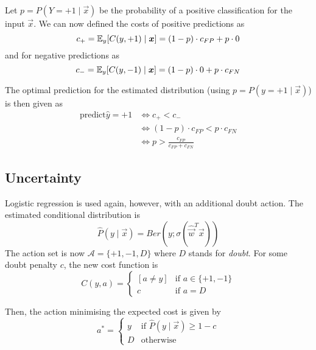 Let $p = P(Y = +1 \mid \vec{x})$ be the
probability of a positive classification
for the input $\vec{x}$.
We can now defined the costs of positive
predictions as
\begin{equation*}
    c_+ = \mathbb{E}_y[C(y, +1) \mid \boldsymbol{x}]
    = (1 - p) \cdot c_{FP} + p \cdot 0
\end{equation*}
and for negative predictions as
\begin{equation*}
    c_- = \mathbb{E}_y[C(y, -1) \mid \boldsymbol{x}]
    = (1 - p) \cdot 0 + p \cdot c_{FN}
\end{equation*}

The optimal prediction for the estimated
distribution 
(using $p = P(y = +1 \mid \vec{x})$)
is then given as
\begin{align*}
    \text{predict} \hat{y} = +1
    &\Leftrightarrow c_+ < c_- \\
    &\Leftrightarrow (1-p) \cdot c_{FP} < p \cdot c_{FN} \\
    &\Leftrightarrow p > \frac{c_{FP}}{c_{FP} + c_{FN}}
\end{align*}


\subsection{Uncertainty}
Logistic regression is used again,
however, with an additional doubt action.
The estimated conditional distribution is
\begin{equation*}
    \hat{P}(y \mid \vec{x}) =
    Ber(y ; \sigma(\hat{\vec{w}}^T \vec{x}))
\end{equation*}
The action set is now
$\mathcal{A} = \{+1, -1, D\}$
where $D$ stands for \emph{doubt}.
For some doubt penalty $c$, the
new cost function is
\begin{equation*}
    C(y, a) =
    \begin{cases}
        [a \neq y] & \text{if $a \in \{+1, -1\}$} \\
        c & \text{if $a = D$}
    \end{cases}
\end{equation*}

Then, the action minimising the expected
cost is given by
\begin{equation*}
    a^* = \begin{cases}
        y & \text{if $\hat{P}(y \mid \vec{x}) \geq 1 - c$} \\
        D & \text{otherwise}
    \end{cases}
\end{equation*}


